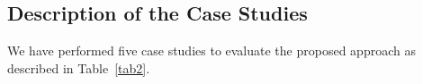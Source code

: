\documentclass[review]{elsarticle}
\begin{document}
\subsection{Description of the Case Studies}
%
We have performed five case studies to evaluate the proposed approach as described in Table~\ref{tab2}. %
\end{document}
